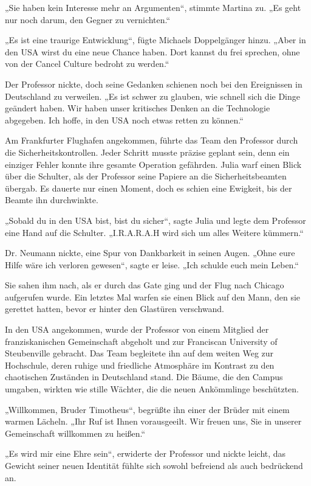 \documentclass[
]{article}
\begin{document}
„Sie haben kein Interesse mehr an Argumenten``, stimmte Martina zu. „Es
geht nur noch darum, den Gegner zu vernichten.``

„Es ist eine traurige Entwicklung``, fügte Michaels Doppelgänger hinzu.
„Aber in den USA wirst du eine neue Chance haben. Dort kannst du frei
sprechen, ohne von der Cancel Culture bedroht zu werden.``

Der Professor nickte, doch seine Gedanken schienen noch bei den
Ereignissen in Deutschland zu verweilen. „Es ist schwer zu glauben, wie
schnell sich die Dinge geändert haben. Wir haben unser kritisches Denken
an die Technologie abgegeben. Ich hoffe, in den USA noch etwas retten zu
können.``

Am Frankfurter Flughafen angekommen, führte das Team den Professor durch
die Sicherheitskontrollen. Jeder Schritt musste präzise geplant sein,
denn ein einziger Fehler konnte ihre gesamte Operation gefährden. Julia
warf einen Blick über die Schulter, als der Professor seine Papiere an
die Sicherheitsbeamten übergab. Es dauerte nur einen Moment, doch es
schien eine Ewigkeit, bis der Beamte ihn durchwinkte.

„Sobald du in den USA bist, bist du sicher``, sagte Julia und legte dem
Professor eine Hand auf die Schulter. „I.R.A.R.A.H wird sich um alles
Weitere kümmern.``

Dr. Neumann nickte, eine Spur von Dankbarkeit in seinen Augen. „Ohne
eure Hilfe wäre ich verloren gewesen``, sagte er leise. „Ich schulde
euch mein Leben.``

Sie sahen ihm nach, als er durch das Gate ging und der Flug nach Chicago
aufgerufen wurde. Ein letztes Mal warfen sie einen Blick auf den Mann,
den sie gerettet hatten, bevor er hinter den Glastüren verschwand.

In den USA angekommen, wurde der Professor von einem Mitglied der
franziskanischen Gemeinschaft abgeholt und zur Franciscan University of
Steubenville gebracht. Das Team begleitete ihn auf dem weiten Weg zur
Hochschule, deren ruhige und friedliche Atmosphäre im Kontrast zu den
chaotischen Zuständen in Deutschland stand. Die Bäume, die den Campus
umgaben, wirkten wie stille Wächter, die die neuen Ankömmlinge
beschützten.

„Willkommen, Bruder Timotheus``, begrüßte ihn einer der Brüder mit einem
warmen Lächeln. „Ihr Ruf ist Ihnen vorausgeeilt. Wir freuen uns, Sie in
unserer Gemeinschaft willkommen zu heißen.``

„Es wird mir eine Ehre sein``, erwiderte der Professor und nickte
leicht, das Gewicht seiner neuen Identität fühlte sich sowohl befreiend
als auch bedrückend an.
\end{document}
